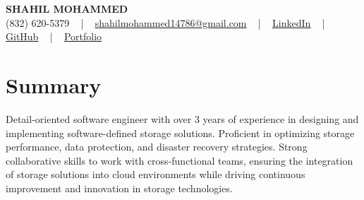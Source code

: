 \documentclass[letterpaper,10pt]{article}
\begin{document}
\begin{center}
    {\fontsize{14pt}{12pt}\selectfont \textbf{\MakeUppercase{Shahil Mohammed}}}\\ \vspace{2pt}
    \fontsize{10pt}{12pt}\selectfont (832) 620-5379 ~ | ~ \href{mailto:shahilmohammed14786@gmail.com}{shahilmohammed14786@gmail.com} ~ | ~  
    \href{https://www.linkedin.com/in/shahil-mohammed-9652931a1/}{\color{blue}\underline{LinkedIn}}  ~ | ~ 
    \href{https://github.com/freakbeast14}{\color{blue}\underline{GitHub}} ~ | ~ 
    \href{https://shahil-mohammed.netlify.app/}{\color{blue}\underline{Portfolio}}
    \vspace{-8pt}
\end{center}

\section{Summary}
\vspace{-2pt}\fontsize{8pt}{9pt}\selectfont
Detail-oriented software engineer with over 3 years of experience in designing and implementing software-defined storage solutions. Proficient in optimizing storage performance, data protection, and disaster recovery strategies. Strong collaborative skills to work with cross-functional teams, ensuring the integration of storage solutions into cloud environments while driving continuous improvement and innovation in storage technologies.
 \vspace{-5pt}
 
\vspace{-2pt}
\end{document}
